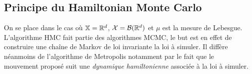 \documentclass[10pt,a4paper]{article}
\begin{document}




\subsection{Principe du Hamiltonian Monte Carlo}

On se place dans le cas où $\mathbb{X} = \mathbb{R}^d$, $\mathcal{X} = \mathcal{B}(\mathbb{R}^d)$ et $\mu$ est la mesure de Lebesgue. 
L'algorithme HMC fait partie des algorithmes MCMC, le but est en effet de construire une chaîne de Markov de loi invariante la loi à simuler. Il diffère néanmoins de l'algorithme de Metropolis notamment par le fait que le mouvement proposé suit une \emph{dynamique hamiltonienne} associée à la loi à simuler.
\end{document}
